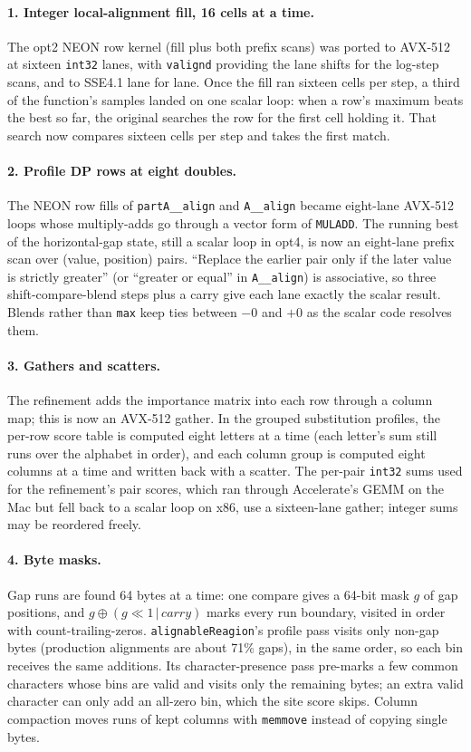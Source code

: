 \documentclass[11pt]{article}
\newcommand{\code}[1]{\texttt{#1}}
\begin{document}
\paragraph{1. Integer local-alignment fill, 16 cells at a time.} The opt2 NEON row kernel
(fill plus both prefix scans) was ported to AVX-512 at sixteen \code{int32} lanes, with
\code{valignd} providing the lane shifts for the log-step scans, and to SSE4.1 lane for lane.
Once the fill ran sixteen cells per step, a third of the function's samples landed on one
scalar loop: when a row's maximum beats the best so far, the original searches the row for
the first cell holding it. That search now compares sixteen cells per step and takes the
first match.

\paragraph{2. Profile DP rows at eight doubles.} The NEON row fills of \code{partA\_\_align}
and \code{A\_\_align} became eight-lane AVX-512 loops whose multiply-adds go through a vector
form of \code{MULADD}. The running best of the horizontal-gap state, still a scalar loop in
opt4, is now an eight-lane prefix scan over (value, position) pairs. ``Replace the earlier
pair only if the later value is strictly greater'' (or ``greater or equal'' in
\code{A\_\_align}) is associative, so three shift-compare-blend steps plus a carry give each
lane exactly the scalar result. Blends rather than \code{max} keep ties between $-0$ and $+0$
as the scalar code resolves them.

\paragraph{3. Gathers and scatters.} The refinement adds the importance matrix into each row
through a column map; this is now an AVX-512 gather. In the grouped substitution profiles,
the per-row score table is computed eight letters at a time (each letter's sum still runs
over the alphabet in order), and each column group is computed eight columns at a time and
written back with a scatter. The per-pair \code{int32} sums used for the refinement's pair
scores, which ran through Accelerate's GEMM on the Mac but fell back to a scalar loop on x86,
use a sixteen-lane gather; integer sums may be reordered freely.

\paragraph{4. Byte masks.} Gap runs are found 64 bytes at a time: one compare gives a 64-bit
mask $g$ of gap positions, and $g \oplus (g \ll 1 \,|\, \mathit{carry})$ marks every run
boundary, visited in order with count-trailing-zeros. \code{alignableReagion}'s profile pass
visits only non-gap bytes (production alignments are about 71\% gaps), in the same order, so
each bin receives the same additions. Its character-presence pass pre-marks a few common
characters whose bins are valid and visits only the remaining bytes; an extra valid
character can only add an all-zero bin, which the site score skips. Column compaction moves
runs of kept columns with \code{memmove} instead of copying single bytes.
\end{document}

